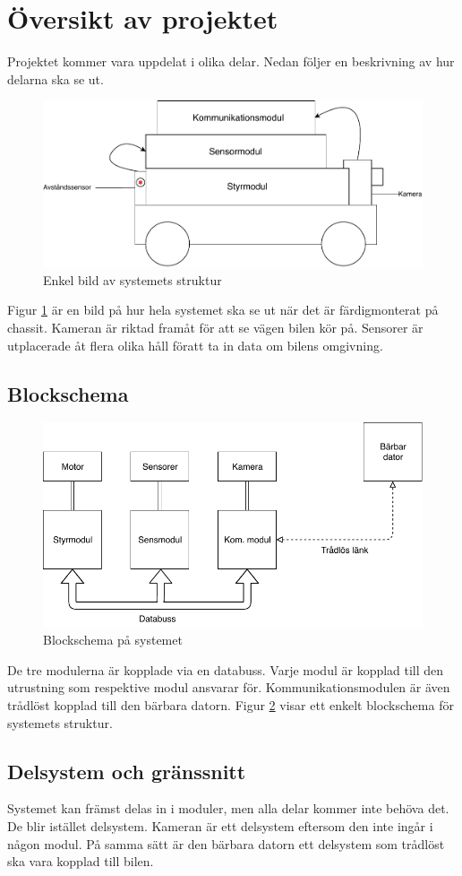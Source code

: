 \documentclass[systemskiss/skiss.tex]{subfiles}
\begin{document}
\section{Översikt av projektet}
Projektet kommer vara uppdelat i olika delar. Nedan följer en beskrivning av hur delarna ska se ut.

\begin{figure}[h]
    \centering
    \includegraphics[width=0.6\linewidth]{systemskiss/figures/taxibilen.pdf}
    \caption{Enkel bild av systemets struktur}
    \label{fig:taxiskiss}
\end{figure}
Figur \ref{fig:taxiskiss} är en bild på hur hela systemet ska se ut när det är färdigmonterat på chassit. Kameran är riktad framåt för att se vägen bilen kör på. Sensorer är utplacerade åt flera olika håll föratt ta in data om bilens omgivning.

\subsection{Blockschema}

\begin{figure}[h]
    \centering
    \includegraphics[width=0.6\linewidth]{systemskiss/figures/blockskiss.pdf}
    \caption{Blockschema på systemet}
    \label{fig:blockskiss}
\end{figure}

De tre modulerna är kopplade via en databuss. Varje modul är kopplad till den utrustning som respektive modul ansvarar för. Kommunikationsmodulen är även trådlöst kopplad till den bärbara datorn. Figur \ref{fig:blockskiss} visar ett enkelt blockschema för systemets struktur.
 
\subsection{Delsystem och gränssnitt}
Systemet kan främst delas in i moduler, men alla delar kommer inte behöva det. De blir istället delsystem. Kameran är ett delsystem eftersom den inte ingår i någon modul. På samma sätt är den bärbara datorn ett delsystem som trådlöst ska vara kopplad till bilen. 
\end{document}
